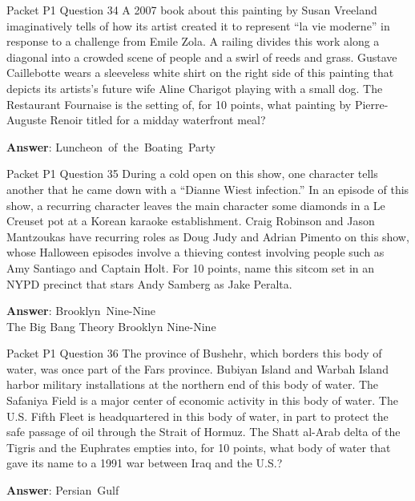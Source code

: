 \begin{frame}{Packet P1 Question 34}
A 2007 book about this painting by Susan Vreeland imaginatively tells of how its artist created it to represent ``la vie moderne'' in response to a challenge from Emile Zola. A railing divides this work along   a diagonal into a crowded scene of people and a swirl of reeds and grass. Gustave Caillebotte wears   a sleeveless white shirt on the right side of this painting that depicts its artists's future wife Aline Charigot playing   with a small dog. The Restaurant Fournaise is the setting of, for 10 points, what painting by Pierre-Auguste Renoir titled for a midday   waterfront meal?

\textbf{Answer}: Luncheon\ of\ the\ Boating\ Party\\
\end{frame}

\begin{frame}{Packet P1 Question 35}
During a cold open on this show, one character tells another that   he came down with a ``Dianne Wiest infection.'' In an episode of this show, a recurring character leaves the main character some diamonds in a Le Creuset pot at a Korean karaoke establishment. Craig Robinson and Jason Mantzoukas have recurring roles as Doug Judy and Adrian Pimento on this show, whose Halloween episodes involve a thieving contest involving people such as Amy Santiago and Captain Holt. For 10 points,   name this sitcom set in an NYPD precinct that stars Andy Samberg     as Jake Peralta.  

\textbf{Answer}: Brooklyn\ Nine-Nine\\
 The Big Bang Theory
 Brooklyn Nine-Nine
\end{frame}

\begin{frame}{Packet P1 Question 36}
The province of Bushehr, which borders this body of water, was once part of the Fars province. Bubiyan Island and Warbah Island harbor military installations at the northern end of this body of water. The Safaniya Field is a major center of economic activity in this body of water. The U.S. Fifth Fleet is headquartered in this body of water, in part to protect the safe passage of oil through the Strait of Hormuz. The Shatt   al-Arab delta of   the Tigris and the   Euphrates empties into, for 10 points, what body of water that gave its name to a 1991 war between Iraq   and the U.S.?

\textbf{Answer}: Persian\ Gulf\\
\end{frame}

